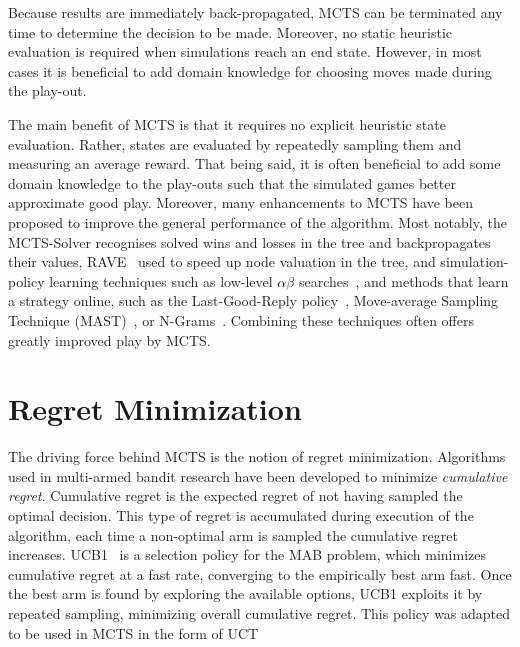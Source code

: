 \documentclass{kecsmstr}
\begin{document}
Because results are immediately back-propagated, MCTS can be terminated any time to determine the decision to be made. Moreover, no static heuristic evaluation is required when simulations reach an end state. However, in most cases it is beneficial to add domain knowledge for choosing moves made during the play-out.

The main benefit of MCTS is that it requires no explicit heuristic state evaluation. Rather, states are evaluated by repeatedly sampling them and measuring an average reward. That being said, it is often beneficial to add some domain knowledge to the play-outs such that the simulated games better approximate good play. Moreover, many enhancements to MCTS have been proposed to improve the general performance of the algorithm. Most notably, the MCTS-Solver  recognises solved wins and losses in the tree and backpropagates their values, RAVE~ used to speed up node valuation in the tree, and simulation-policy learning techniques such as low-level $\alpha\beta$ searches~, and methods that learn a strategy online, such as the Last-Good-Reply policy~, Move-average Sampling Technique (MAST)~, or N-Grams~. Combining these techniques often offers greatly improved play by MCTS.

\section{Regret Minimization}
The driving force behind MCTS is the notion of regret minimization. Algorithms used in multi-armed bandit research have been developed to minimize \emph{cumulative regret}. Cumulative regret is the expected regret of not having sampled the optimal decision. This type of regret is accumulated during execution of the algorithm, each time a non-optimal arm is sampled the cumulative regret increases. UCB1~ is a selection policy for the MAB problem, which minimizes cumulative regret at a fast rate, converging to the empirically best arm fast. Once the best arm is found by exploring the available options, UCB1 exploits it by repeated sampling, minimizing overall cumulative regret. This policy was adapted to be used in MCTS in the form of UCT~
\end{document}
